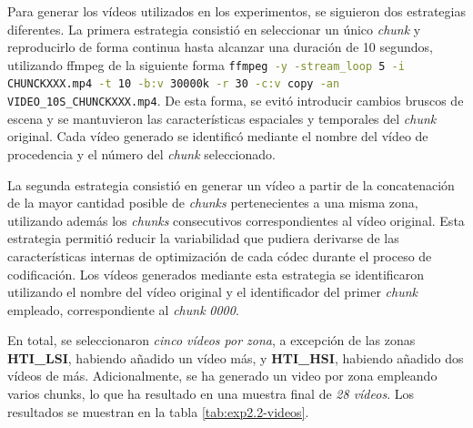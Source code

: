 Para generar los vídeos utilizados en los experimentos, se siguieron dos estrategias diferentes. La primera estrategia consistió en seleccionar un único \textit{chunk} y reproducirlo de forma continua hasta alcanzar una duración de 10 segundos, utilizando ffmpeg de la siguiente forma \lstinline[language=sh,label={code:ffmpeg-loopvideo},caption={}]{ffmpeg -y -stream_loop 5 -i CHUNCKXXX.mp4 -t 10 -b:v 30000k -r 30 -c:v copy -an VIDEO_10S_CHUNCKXXX.mp4}. De esta forma, se evitó introducir cambios bruscos de escena y se mantuvieron las características espaciales y temporales del \textit{chunk} original. Cada vídeo generado se identificó mediante el nombre del vídeo de procedencia y el número del \textit{chunk} seleccionado.

La segunda estrategia consistió en generar un vídeo a partir de la concatenación de la mayor cantidad posible de \textit{chunks} pertenecientes a una misma zona, utilizando además los \textit{chunks} consecutivos correspondientes al vídeo original. Esta estrategia permitió reducir la variabilidad que pudiera derivarse de las características internas de optimización de cada códec durante el proceso de codificación. Los vídeos generados mediante esta estrategia se identificaron utilizando el nombre del vídeo original y el identificador del primer \textit{chunk} empleado, correspondiente al \textit{chunk} \textit{0000}.

En total, se seleccionaron \textit{cinco vídeos por zona}, a excepción de las zonas \textbf{HTI\_LSI}, habiendo añadido un vídeo más, y \textbf{HTI\_HSI}, habiendo añadido dos vídeos de más. Adicionalmente, se ha generado un video por zona empleando varios chunks, lo que ha resultado en una muestra final de \textit{28 vídeos}. Los resultados se muestran en la tabla \ref{tab:exp2.2-videos}.

